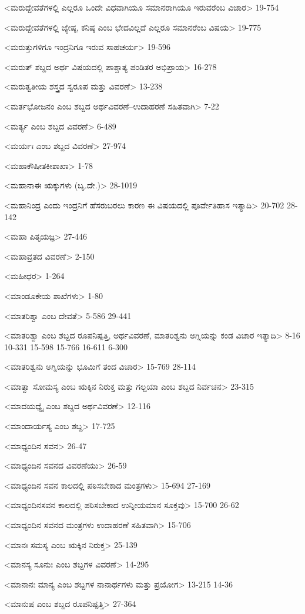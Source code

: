 <ಮರುದ್ದೇವತೆಗಳಲ್ಲಿ ಎಲ್ಲರೂ ಒಂದೇ ವಿಧವಾಗಿಯೂ ಸಮಾನರಾಗಿಯೂ ಇರುವರೆಂಬ ವಿಚಾರ>
19-754

<ಮರುದ್ದೇವತೆಗಳಲ್ಲಿ ಜ್ಯೇಷ್ಠ, ಕನಿಷ್ಠ ಎಂಬ ಭೇದವಿಲ್ಲದೆ ಎಲ್ಲರೂ ಸಮಾನರೆಂಬ ವಿಷಯ>
19-775

<ಮರುತ್ತುಗಳಿಗೂ ಇಂದ್ರನಿಗೂ ಇರುವ ಸಾಹಚರ್ಯ>
19-596

<ಮರುತ್‍ ಶಬ್ದದ ಅರ್ಥ ವಿಷಯದಲ್ಲಿ ಪಾಶ್ಚಾತ್ಯ ಪಂಡಿತರ ಅಭಿಪ್ರಾಯ>
16-278

<ಮರುತ್ವತೀಯ ಶಸ್ತ್ರದ ಸ್ವರೂಪ ಮತ್ತು ವಿವರಣೆ>
13-238

<ಮರ್ತಭೋಜನಂ ಎಂಬ ಶಬ್ದದ ಅರ್ಥವಿವರಣೆ–ಉದಾಹರಣೆ ಸಹಿತವಾಗಿ>
7-22

<ಮರ್ತ್ಯ ಎಂಬ ಶಬ್ದದ ವಿವರಣೆ>
6-489

<ಮರ್ಯಃ ಎಂಬ ಶಬ್ದದ ವಿವರಣೆ>
27-974

<ಮಹಾಕೌಷೀತಕೀಶಾಖಾ>
1-78

<ಮಹಾನಾಈ ಋಕ್ಕುಗಳು (ಬೃ.ದೇ.)>
28-1019

<ಮಹಾನಿಂದ್ರ ಎಂದು ಇಂದ್ರನಿಗೆ ಹೆಸರುಬರಲು ಕಾರಣ ಈ ವಿಷಯದಲ್ಲಿ ಪೂರ್ವೇತಿಹಾಸ ಇತ್ಯಾದಿ>
20-702
28-142

<ಮಹಾ ಪಿತೃಯಜ್ಞ>
27-446

<ಮಹಾವ್ರತದ ವಿವರಣೆ>
2-150

<ಮಹೀಧರ>
1-264

<ಮಾಂಡೂಕೇಯ ಶಾಖೆಗಳು>
1-80

<ಮಾತರಿಶ್ವಾ ಎಂಬ ದೇವತೆ>
5-586
29-441

<ಮಾತರಿಶ್ವಾ ಎಂಬ ಶಬ್ದದ ರೂಪನಿಷ್ಪತ್ತಿ, ಅರ್ಥವಿವರಣೆ, ಮಾತರಿಶ್ವನು ಅಗ್ನಿಯನ್ನು ಕಂಡ ವಿಚಾರ ಇತ್ಯಾದಿ>
8-16
10-331 
15-598
15-766 
16-611
6-300

<ಮಾತರಿಶ್ವನು ಅಗ್ನಿಯನ್ನು ಭೂಮಿಗೆ ತಂದ ವಿಚಾರ>
15-769
28-114

<ಮಾತ್ವಾ ಸೋಮಸ್ಯ ಎಂಬ ಋಕ್ಕಿನ ನಿರುಕ್ತ ಮತ್ತು ಗಲ್ದಯಾ ಎಂಬ ಶಬ್ದದ ನಿರ್ವಚನ>
23-315

<ಮಾದಯಧ್ಯೈ ಎಂಬ ಶಬ್ದದ ಅರ್ಥವಿವರಣೆ>
12-116

<ಮಾಂದಾರ್ಯಸ್ಯ ಎಂಬ ಶಬ್ದ>
17-725

<ಮಾಧ್ಯಂದಿನ ಸವನ>
26-47

<ಮಾಧ್ಯಂದಿನ ಸವನದ ವಿವರಣೆಯು>
26-59

<ಮಾಧ್ಯಂದಿನ ಸವನ ಕಾಲದಲ್ಲಿ ಪಠಿಸಬೇಕಾದ ಮಂತ್ರಗಳು>
15-694
27-169

<ಮಾಧ್ಯಂದಿನಸವನ ಕಾಲದಲ್ಲಿ ಪಠಿಸಬೇಕಾದ ಉನ್ನೀಯಮಾನ ಸೂಕ್ತವು>
15-700
26-62

<ಮಾಧ್ಯಂದಿನ ಸವನದ ಮಂತ್ರಗಳು ಉದಾಹರಣೆ ಸಹಿತವಾಗಿ>
15-706

<ಮಾನಃ ಸಮಸ್ಯ ಎಂಬ ಋಕ್ಕಿನ ನಿರುಕ್ತ>
25-139


<ಮಾನಸ್ಯ ಸೂನುಃ ಎಂಬ ಶಬ್ದಗಳ ವಿವರಣೆ>
14-295

<ಮಾನಾನಃ ಮಾನ್ಯ ಎಂಬ ಶಬ್ದಗಳ ನಾನಾರ್ಥಗಳು ಮತ್ತು ಪ್ರಯೋಗ>
13-215
14-36

<ಮಾನುಷ ಎಂಬ ಶಬ್ದದ ರೂಪನಿಷ್ಪತ್ತಿ>
27-364

